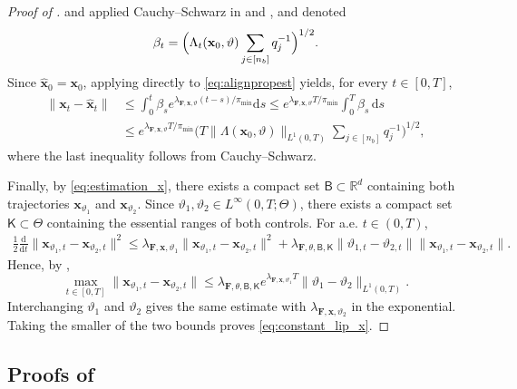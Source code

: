 \documentclass[twoside,11pt]{article}
\theoremstyle{plain}
\def\R{\mathbb R}
\newcommand{\diff}{\mathrm{d}}
\newcommand{\bfF}{\mathbf{F}}
\newcommand{\bfx}{\mathbf{x}}
\begin{document}
\begin{proof}[Proof of ]
and applied Cauchy--Schwarz in  and , and denoted
\begin{align*}
    \beta_t =  \Bigl(\Lambda_t(\bfx_0,\vartheta)\sum_{j\in[n_b]}q_j^{-1}\Bigr)^{1/2}.
\end{align*}
Since $\hat{\bfx}_0=\bfx_0$, applying 
directly to \eqref{eq:alignpropest} yields, for every $t\in[0,T]$,
\begin{align*}
\|\bfx_t-\hat{\bfx}_t\|
&\le
\int_0^t
\beta_s
e^{\lambda_{\bfF,\bfx,\vartheta}(t-s)/\pi_{\min}}
\diff s \le
e^{\lambda_{\bfF,\bfx,\vartheta}T/\pi_{\min}}
\int_0^T\beta_s\,\diff s \\
&\le
e^{\lambda_{\bfF,\bfx,\vartheta}T/\pi_{\min}}
\Big(
T\|\Lambda(\bfx_0,\vartheta)\|_{L^1(0,T)}
\sum_{j\in[n_b]}q_j^{-1}
\Big)^{1/2},
\end{align*}
where the last inequality follows from Cauchy--Schwarz.

Finally, by \eqref{eq:estimation_x}, there exists a compact set
$\mathsf B\subset\R^d$ containing both trajectories
$\bfx_{\vartheta_1}$ and $\bfx_{\vartheta_2}$. Since $\vartheta_1,\vartheta_2\in L^\infty(0,T;\Theta)$, there exists
a compact set $\mathsf K\subset\Theta$ containing the essential ranges
of both controls. For a.e. $t\in(0,T)$,
\begin{align*}
\frac12\frac{\diff}{\diff t}
\|\bfx_{\vartheta_1,t}-\bfx_{\vartheta_2,t}\|^2
\le
\lambda_{\bfF,\bfx,\vartheta_1}
\|\bfx_{\vartheta_1,t}-\bfx_{\vartheta_2,t}\|^2 +
\lambda_{\bfF,\theta,\mathsf B,\mathsf K}
\|\vartheta_{1,t}-\vartheta_{2,t}\|
\|\bfx_{\vartheta_1,t}-\bfx_{\vartheta_2,t}\|.
\end{align*}
Hence, by ,
\[
\max_{t\in[0,T]}
\|\bfx_{\vartheta_1,t}-\bfx_{\vartheta_2,t}\|
\le
\lambda_{\bfF,\theta,\mathsf B,\mathsf K}
e^{\lambda_{\bfF,\bfx,\vartheta_1}T}
\|\vartheta_1-\vartheta_2\|_{L^1(0,T)}.
\]
Interchanging $\vartheta_1$ and $\vartheta_2$ gives the same estimate
with $\lambda_{\bfF,\bfx,\vartheta_2}$ in the exponential. Taking the
smaller of the two bounds proves \eqref{eq:constant_lip_x}.
\end{proof}


\subsection*{Proofs of }\label{ss:prfs1}
\end{document}
